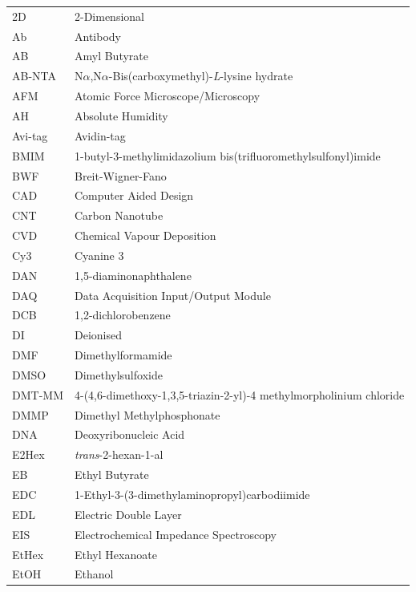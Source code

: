 \documentclass[
  a4paper,
]{scrbook}
\begin{document}
\begin{table}[H]
  \begin{tabular}{@{}p{} p{}@{}}  %
    2D  & 2-Dimensional  \\[5pt]
    Ab  & Antibody  \\[5pt]
    AB  & Amyl Butyrate  \\[5pt]
    AB-NTA  & N$\alpha$,N$\alpha$-Bis(carboxymethyl)-\textit{L}-lysine hydrate  \\[5pt]
    AFM  & Atomic Force Microscope/Microscopy  \\[5pt]
    AH  & Absolute Humidity  \\[5pt]
    Avi-tag  & Avidin-tag  \\[5pt]
    BMIM  & 1-butyl-3-methylimidazolium bis(trifluoromethylsulfonyl)imide  \\[5pt]
    BWF  & Breit-Wigner-Fano  \\[5pt]
    CAD  & Computer Aided Design \\[5pt]
    CNT  & Carbon Nanotube  \\[5pt]
    CVD  & Chemical Vapour Deposition  \\[5pt]
    Cy3  & Cyanine 3  \\[5pt]
    DAN  & 1,5-diaminonaphthalene  \\[5pt]
    DAQ  & Data Acquisition Input/Output Module  \\[5pt]
    DCB  & 1,2-dichlorobenzene  \\[5pt]
    DI  & Deionised  \\[5pt]
    DMF  & Dimethylformamide   \\[5pt]
    DMSO  & Dimethylsulfoxide   \\[5pt]
    DMT-MM   & 4-(4,6-dimethoxy-1,3,5-triazin-2-yl)-4 methylmorpholinium chloride \\[5pt]
    DMMP  & Dimethyl Methylphosphonate  \\[5pt]
    DNA  & Deoxyribonucleic Acid  \\[5pt]
    E2Hex  & \textit{trans}-2-hexan-1-al  \\[5pt]
    EB  & Ethyl Butyrate  \\[5pt]
    EDC  & 1-Ethyl-3-(3-dimethylaminopropyl)carbodiimide  \\[5pt]
    EDL  & Electric Double Layer  \\[5pt]
    EIS  & Electrochemical Impedance Spectroscopy  \\[5pt]
    EtHex  & Ethyl Hexanoate  \\[5pt]
    EtOH  & Ethanol  \\[5pt]
  \end{tabular}
\end{table}
\end{document}

